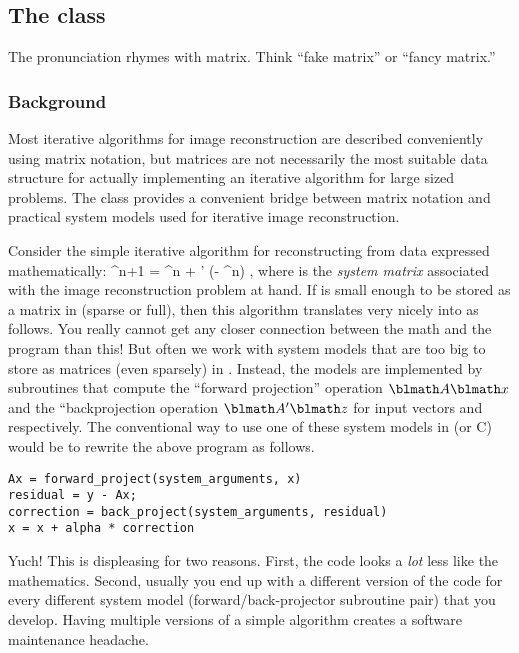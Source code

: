 

\subsection{The \fatrixx class}

The pronunciation rhymes with matrix.
Think ``fake matrix''
or ``fancy matrix.''


\subsubsection{Background}

Most iterative algorithms
for image reconstruction
are described conveniently using matrix notation,
but matrices are not necessarily
the most suitable data structure
for actually implementing an iterative algorithm
for large sized problems.
The \fatrixx class
provides a convenient bridge
between matrix notation
and practical system models
used for iterative image reconstruction.

Consider the simple iterative algorithm
for reconstructing \x from data \y
expressed mathematically:
\be
\x^{n+1} = \x^n + \alpha \A' (\y - \A\x^n)
,
where \A is the \emph{system matrix}
associated with
the image reconstruction problem at hand.
%
If \A is small enough
to be stored as a matrix in \matlab
(sparse or full),
then this algorithm translates
very nicely into \matlab as follows.
\be
{}
You really cannot get any closer connection
between the math and the program than this!
But often we work
with system models
that are too big to store
as matrices (even sparsely) in \matlab.
Instead,
the models
are implemented by subroutines
that compute the ``forward projection'' operation
$\A \x$
and the ``backprojection operation
$\A' \z$
for input vectors \x and \z respectively.
%
The conventional way
to use one of these system models
in \matlab (or C) would be to rewrite
the above program as follows.
\begin{verbatim}
Ax = forward_project(system_arguments, x)
residual = y - Ax;
correction = back_project(system_arguments, residual)
x = x + alpha * correction
\end{verbatim}
Yuch!
This is displeasing for two reasons.
First,
the code looks a \emph{lot} less like the mathematics.
Second,
usually you end up with a different version of the code
for every different system model
(forward/back-projector subroutine pair)
that you develop.
Having multiple versions
of a simple algorithm
creates a software maintenance headache.

